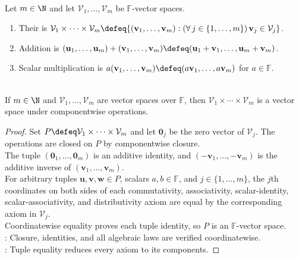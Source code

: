 \begin{definition} \label{def:finite-product-vector-spaces} \\
Let $m\in\N$ and let $\mathcal{V}_1,\ldots,\mathcal{V}_m$ be $\mathbb{F}$-vector spaces.
\begin{enumerate}[label=(\roman*)]
\setlength{\itemsep}{0pt}
\item Their  is $\mathcal{V}_1\times\cdots\times\mathcal{V}_m\defeq\{(\mathbf{v}_1,\ldots,\mathbf{v}_m):(\forall\,j\in\{1,\ldots,m\})\,\mathbf{v}_j\in\mathcal{V}_j\}$.
\item Addition is $(\mathbf{u}_1,\ldots,\mathbf{u}_m)+(\mathbf{v}_1,\ldots,\mathbf{v}_m)\defeq(\mathbf{u}_1+\mathbf{v}_1,\ldots,\mathbf{u}_m+\mathbf{v}_m)$.
\item Scalar multiplication is $a(\mathbf{v}_1,\ldots,\mathbf{v}_m)\defeq(a\mathbf{v}_1,\ldots,a\mathbf{v}_m)$ for $a\in\mathbb{F}$.
\end{enumerate}
\end{definition}

\begin{proposition} \label{prop:product-vector-space} \\
If $m\in\N$ and $\mathcal{V}_1,\ldots,\mathcal{V}_m$ are vector spaces over $\mathbb{F}$, then $\mathcal{V}_1\times\cdots\times\mathcal{V}_m$ is a vector space under componentwise operations.
\begin{proof}
Set $P\defeq\mathcal{V}_1\times\cdots\times\mathcal{V}_m$ and let $\mathbf{0}_j$ be the zero vector of $\mathcal{V}_j$. The operations are closed on $P$ by componentwise closure.\\
The tuple $(\mathbf{0}_1,\ldots,\mathbf{0}_m)$ is an additive identity, and $(-\mathbf{v}_1,\ldots,-\mathbf{v}_m)$ is the additive inverse of $(\mathbf{v}_1,\ldots,\mathbf{v}_m)$.\\
For arbitrary tuples $\mathbf{u},\mathbf{v},\mathbf{w}\in P$, scalars $a,b\in\mathbb{F}$, and $j\in\{1,\ldots,m\}$, the $j$th coordinates on both sides of each commutativity, associativity, scalar-identity, scalar-associativity, and distributivity axiom are equal by the corresponding axiom in $\mathcal{V}_j$.\\
Coordinatewise equality proves each tuple identity, so $P$ is an $\mathbb{F}$-vector space.\\
: Closure, identities, and all algebraic laws are verified coordinatewise.\\
: Tuple equality reduces every axiom to its components.
\end{proof}
\end{proposition}

